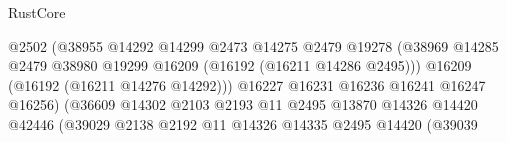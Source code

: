 \begin{lexlean}{RustCore}
\begin{coremodule}
                                                      @2502
                                                      (@38955
                                                        @14292
                                                        @14299
                                                        @2473
                                                        @14275
                                                        @2479
                                                        @19278
                                                        (@38969
                                                          @14285
                                                          @2479
                                                          @38980
                                                          @19299
                                                          @16209
                                                          (@16192 (@16211 @14286 @2495)))
                                                        @16209
                                                        (@16192 (@16211 @14276 @14292)))
                                                      @16227
                                                      @16231
                                                      @16236
                                                      @16241
                                                      @16247
                                                      @16256)
                                                    (@36609
                                                      @14302
                                                      @2103
                                                      @2193
                                                      @11
                                                      @2495
                                                      @13870
                                                      @14326
                                                      @14420
                                                      @42446
                                                      (@39029
                                                        @2138
                                                        @2192
                                                        @11
                                                        @14326
                                                        @14335
                                                        @2495
                                                        @14420
                                                        (@39039

\end{coremodule}
\end{lexlean}
